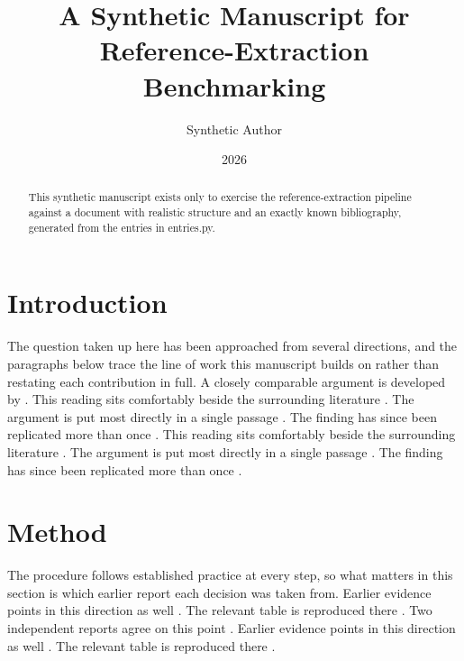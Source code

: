 \documentclass{article}
\title{A Synthetic Manuscript for Reference-Extraction Benchmarking}
\author{Synthetic Author}
\date{2026}
\begin{document}
\maketitle

\begin{abstract}
This synthetic manuscript exists only to exercise the reference-extraction pipeline against a document with realistic structure and an exactly known bibliography, generated from the entries in entries.py.
\end{abstract}

\section{Introduction}
The question taken up here has been approached from several directions, and the paragraphs below trace the line of work this manuscript builds on rather than restating each contribution in full. A closely comparable argument is developed by \textcite{kahneman1979prospect}. This reading sits comfortably beside the surrounding literature \parencite{lord1968statistical}. The argument is put most directly in a single passage \parencite[p.~14]{bandura1977selfefficacy}. The finding has since been replicated more than once \parencite{milgram1963behavioral,festinger1957cognitive}. This reading sits comfortably beside the surrounding literature \parencite{ainsworth1978patterns}. The argument is put most directly in a single passage \parencite[p.~14]{deciryan2000what}. The finding has since been replicated more than once \parencite{cronbach1951coefficient,granovetter1973strength}.

\section{Method}
The procedure follows established practice at every step, so what matters in this section is which earlier report each decision was taken from. Earlier evidence points in this direction as well \parencite{rosenthaljacobson1968pygmalion}. The relevant table is reproduced there \parencite[p.~87]{asch1956studies}. Two independent reports agree on this point \parencite{rosenberg1965society,rotter1966generalized}. Earlier evidence points in this direction as well \parencite{ekmanfriesen1971constants}. The relevant table is reproduced there \parencite[p.~87]{baumeisterleary1995need}.
\end{document}
